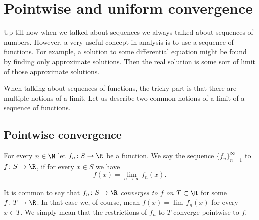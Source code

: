 \documentclass[12pt]{book}
\begin{document}

\section{Pointwise and uniform convergence}
\label{sec:puconv}


Up till now when we talked about sequences we always talked about
sequences of numbers.
However, a very useful concept in analysis is to use a
sequence of functions.
For example, a solution to some
differential equation
might be found by finding only approximate solutions.
Then the real solution is
some sort of limit of those approximate solutions.

When talking about sequences of functions, the 
tricky part is that there are multiple notions of a limit.
Let us describe two common
notions of a limit of a sequence of functions.

\subsection*{Pointwise convergence}

\begin{defn}
For every $n \in \N$
let $f_n \colon S \to \R$ be a function.
We say the sequence
$\{ f_n \}_{n=1}^\infty$
\emph{} to $f \colon S \to \R$, if for every $x
\in S$
we have
\begin{equation*}
f(x) =
\lim_{n\to\infty} f_n(x) .
\end{equation*}
\end{defn}

It is common to say that $f_n \colon S \to \R$
\emph{converges to $f$ on $T \subset \R$}
for some $f \colon T \to \R$.
In that case we, of course, mean 
$f(x) = \lim\, f_n(x)$ for every $x \in T$.
We simply mean that the
restrictions of $f_n$ to $T$ converge pointwise to $f$.
\end{document}

